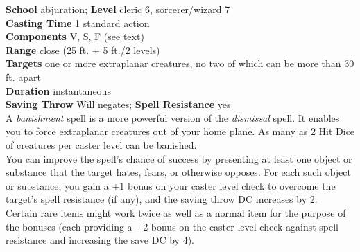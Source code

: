 \textbf{School} abjuration; \textbf{Level} cleric 6, sorcerer/wizard 7\\
\textbf{Casting Time} 1 standard action\\
\textbf{Components} V, S, F (see text)\\
\textbf{Range} close (25 ft. + 5 ft./2 levels)\\
\textbf{Targets} one or more extraplanar creatures, no two of which can be more than 30 ft. apart\\
\textbf{Duration} instantaneous\\
\textbf{Saving Throw }Will negates; \textbf{Spell Resistance} yes\\
A \textit{banishment }spell is a more powerful version of the \textit{dismissal }spell. It enables you to force extraplanar creatures out of your home plane. As many as 2 Hit Dice of creatures per caster level can be banished.\\
You can improve the spell's chance of success by presenting at least one object or substance that the target hates, fears, or otherwise opposes. For each such object or substance, you gain a +1 bonus on your caster level check to overcome the target's spell resistance (if any), and the saving throw DC increases by 2. \\
Certain rare items might work twice as well as a normal item for the purpose of the bonuses (each providing a +2 bonus on the caster level check against spell resistance and increasing the save DC by 4).\\
